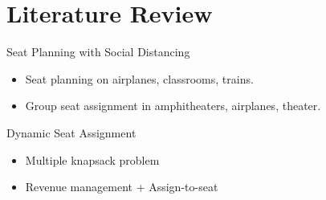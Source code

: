 
\section{Literature Review}
    \frame{\sectionpage}

    \begin{frame}{Seat Planning with Social Distancing}
      \begin{itemize}
        \item Seat planning on airplanes, classrooms, trains.
        \vspace*{2cm}
        \item Group seat assignment in amphitheaters, airplanes, theater.
      \end{itemize}
      \end{frame}
      
      \begin{frame}{Dynamic Seat Assignment}
        \begin{itemize}
          \item Multiple knapsack problem
          \item Revenue management + Assign-to-seat
        \end{itemize}
      \end{frame}